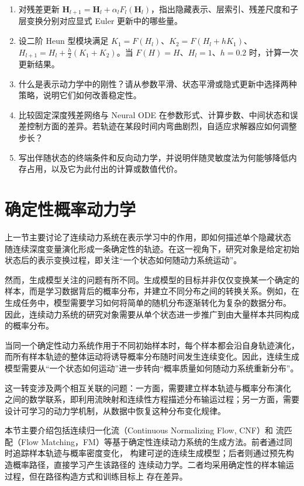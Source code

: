 \documentclass[UTF8,a4paper,zihao=-4,oneside,openany]{ctexbook}
\begin{document}
\begin{exercisebox}
  \begin{enumerate}
    \item 对残差更新 \(\boldsymbol H_{l+1}=\boldsymbol H_l+\alpha_lF_l(\boldsymbol H_l)\)，指出隐藏表示、层索引、残差尺度和子层变换分别对应显式 Euler 更新中的哪些量。
    \item 设二阶 Heun 型模块满足 \(K_1=F(H_l)\)、\(K_2=F(H_l+hK_1)\)、\(H_{l+1}=H_l+\tfrac h2(K_1+K_2)\)。当 \(F(H)=H\)、\(H_l=1\)、\(h=0.2\) 时，计算一次更新结果。
    \item 什么是表示动力学中的刚性？请从参数平滑、状态平滑或隐式更新中选择两种策略，说明它们如何改善稳定性。
    \item 比较固定深度残差网络与 Neural ODE 在参数形式、计算步数、中间状态和误差控制方面的差异。若轨迹在某段时间内弯曲剧烈，自适应求解器应如何调整步长？
    \item 写出伴随状态的终端条件和反向动力学，并说明伴随灵敏度法为何能够降低内存占用，以及它为此付出的计算或数值代价。
  \end{enumerate}
\end{exercisebox}



\section{确定性概率动力学}

上一节主要讨论了连续动力系统在表示学习中的作用，即如何描述单个隐藏状态
随连续深度变量演化形成一条确定性的轨迹。在这一视角下，研究对象是给定初始
状态后的表示变换过程，即关注“一个状态如何随动力系统运动”。

然而，生成模型关注的问题有所不同。生成模型的目标并非仅仅变换某一个确定的
样本，而是学习数据背后的概率分布，并建立不同分布之间的转换关系。例如，在
生成任务中，模型需要学习如何将简单的随机分布逐渐转化为复杂的数据分布。
因此，连续动力系统的研究对象需要从单个状态进一步推广到由大量样本共同构成
的概率分布。

当同一个确定性动力系统作用于不同初始样本时，每个样本都会沿自身轨迹演化，
而所有样本轨迹的整体运动将诱导概率分布随时间发生连续变化。因此，连续生成
模型需要从“一个状态如何运动”进一步转向“概率质量如何随动力系统重新分布”。

这一转变涉及两个相互关联的问题：一方面，需要建立样本轨迹与概率分布演化
之间的数学联系，即利用流映射和连续性方程描述分布输运过程；另一方面，需要
设计可学习的动力学机制，从数据中恢复这种分布变化规律。

本节主要介绍包括连续归一化流（Continuous Normalizing
Flow, CNF）和 流匹配（Flow Matching，FM）等基于确定性连续动力系统的生成方法。前者通过同时追踪样本轨迹与概率密度变化，
构建可逆的连续生成模型；后者则通过预先构造概率路径，直接学习产生该路径的
连续动力学。二者均采用确定性的样本输运过程，但在路径构造方式和训练目标上
存在差异。
\end{document}
